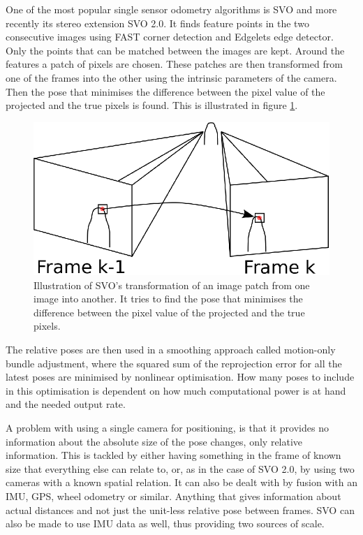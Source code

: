 One of the most popular single sensor odometry algorithms is \gls{SVO}\cite{SVO} and more recently its stereo extension \gls{SVO} 2.0\cite{SVO2}. It finds feature points in the two consecutive images using FAST corner detection\cite{FAST} and Edgelets edge detector\cite{Edgelet}. Only the points that can be matched between the images are kept. Around the features a patch of pixels are chosen. These patches are then transformed from one of the frames into the other using the intrinsic parameters of the camera. Then the pose that minimises the difference between the pixel value of the projected and the true pixels is found. This is illustrated in figure \ref{Fig:SVO}. 

\begin{figure}
    \centering
    \includegraphics[width=0.8\linewidth]{0_Images/3_Background/SVO.eps}
    \caption[Illustration of \gls{SVO}'s transformation of an image patch.]
    {Illustration of \gls{SVO}'s transformation of an image patch from one image into another. It tries to find the pose that minimises the difference between the pixel value of the projected and the true pixels.}
    \label{Fig:SVO}
\end{figure}

The relative poses are then used in a smoothing approach called motion-only bundle adjustment, where the squared sum of the reprojection error for all the latest poses are minimised by nonlinear optimisation. How many poses to include in this optimisation is dependent on how much computational power is at hand and the needed output rate.

A problem with using a single camera for positioning, is that it provides no information about the absolute size of the pose changes, only relative information. This is tackled by either having something in the frame of known size that everything else can relate to, or, as in the case of \gls{SVO} 2.0, by using two cameras with a known spatial relation. It can also be dealt with by fusion with an \gls{IMU}, \gls{GPS}, wheel odometry or similar. Anything that gives information about actual distances and not just the unit-less relative pose between frames. \gls{SVO} can also be made to use \gls{IMU} data as well, thus providing two sources of scale.

